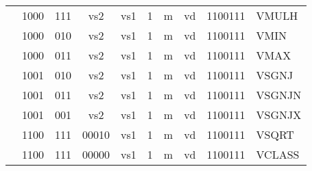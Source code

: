 \begin{table}[p]
\begin{small}
\begin{center}
\begin{tabular}{p{0in}p{0.4in}p{0.1in}p{0.3in}p{0.5in}p{0.5in}p{0.1in}p{0.3in}p{0.5in}p{0.7in}l}
&
\multicolumn{1}{|c|}{1000} &
\multicolumn{2}{c|}{111} &
\multicolumn{1}{c|}{vs2} &
\multicolumn{1}{c|}{vs1} &
\multicolumn{1}{c|}{1} &
\multicolumn{1}{c|}{m} &
\multicolumn{1}{c|}{vd} &
\multicolumn{1}{c|}{1100111} & VMULH \\
\cline{2-10}
  

&
\multicolumn{1}{|c|}{1000} &
\multicolumn{2}{c|}{010} &
\multicolumn{1}{c|}{vs2} &
\multicolumn{1}{c|}{vs1} &
\multicolumn{1}{c|}{1} &
\multicolumn{1}{c|}{m} &
\multicolumn{1}{c|}{vd} &
\multicolumn{1}{c|}{1100111} & VMIN \\
\cline{2-10}
  

&
\multicolumn{1}{|c|}{1000} &
\multicolumn{2}{c|}{011} &
\multicolumn{1}{c|}{vs2} &
\multicolumn{1}{c|}{vs1} &
\multicolumn{1}{c|}{1} &
\multicolumn{1}{c|}{m} &
\multicolumn{1}{c|}{vd} &
\multicolumn{1}{c|}{1100111} & VMAX \\
\cline{2-10}
  

&
\multicolumn{1}{|c|}{1001} &
\multicolumn{2}{c|}{010} &
\multicolumn{1}{c|}{vs2} &
\multicolumn{1}{c|}{vs1} &
\multicolumn{1}{c|}{1} &
\multicolumn{1}{c|}{m} &
\multicolumn{1}{c|}{vd} &
\multicolumn{1}{c|}{1100111} & VSGNJ \\
\cline{2-10}
  

&
\multicolumn{1}{|c|}{1001} &
\multicolumn{2}{c|}{011} &
\multicolumn{1}{c|}{vs2} &
\multicolumn{1}{c|}{vs1} &
\multicolumn{1}{c|}{1} &
\multicolumn{1}{c|}{m} &
\multicolumn{1}{c|}{vd} &
\multicolumn{1}{c|}{1100111} & VSGNJN \\
\cline{2-10}
  

&
\multicolumn{1}{|c|}{1001} &
\multicolumn{2}{c|}{001} &
\multicolumn{1}{c|}{vs2} &
\multicolumn{1}{c|}{vs1} &
\multicolumn{1}{c|}{1} &
\multicolumn{1}{c|}{m} &
\multicolumn{1}{c|}{vd} &
\multicolumn{1}{c|}{1100111} & VSGNJX \\
\cline{2-10}
  

&
\multicolumn{1}{|c|}{1100} &
\multicolumn{2}{c|}{111} &
\multicolumn{1}{c|}{00010} &
\multicolumn{1}{c|}{vs1} &
\multicolumn{1}{c|}{1} &
\multicolumn{1}{c|}{m} &
\multicolumn{1}{c|}{vd} &
\multicolumn{1}{c|}{1100111} & VSQRT \\
\cline{2-10}
  

&
\multicolumn{1}{|c|}{1100} &
\multicolumn{2}{c|}{111} &
\multicolumn{1}{c|}{00000} &
\multicolumn{1}{c|}{vs1} &
\multicolumn{1}{c|}{1} &
\multicolumn{1}{c|}{m} &
\multicolumn{1}{c|}{vd} &
\multicolumn{1}{c|}{1100111} & VCLASS \\
\cline{2-10}
  


\end{tabular}
\end{center}
\end{small}
\end{table}
